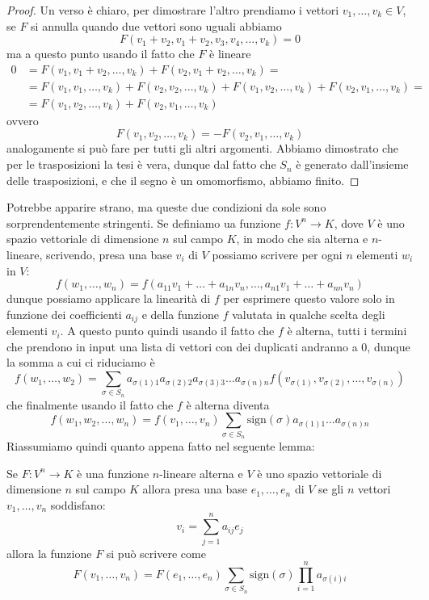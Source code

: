 \documentclass[11pt]{scrartcl}
\begin{document}
   	 \begin{proof}
   	 	Un verso è chiaro, per dimostrare l'altro prendiamo i vettori $v_1,\dots,v_k\in V$, se $F$ si annulla quando due vettori sono uguali abbiamo
   	 	$$F(v_1+v_2,v_1+v_2,v_3,v_4,\dots,v_k)=0$$
   	 	ma a questo punto usando il fatto che $F$ è lineare
   	 	\begin{align*}
   	 		0&=F(v_1,v_1+v_2,\dots,v_k)+F(v_2,v_1+v_2,\dots,v_k)=  \\
   	 		&=F(v_1,v_1,\dots,v_k)+F(v_2,v_2,\dots,v_k)+F(v_1,v_2,\dots,v_k)+F(v_2,v_1,\dots,v_k)= \\
   	 		&=F(v_1,v_2,\dots,v_k)+F(v_2,v_1,\dots,v_k)
   	 	\end{align*}
   	 	ovvero
   	 	$$F(v_1,v_2,\dots,v_k)=-F(v_2,v_1,\dots,v_k)$$
   	 	analogamente si può fare per tutti gli altri argomenti. Abbiamo dimostrato che per le trasposizioni la tesi è vera, dunque dal fatto che $S_n$ è generato dall'insieme delle trasposizioni, e che il segno è un omomorfismo, abbiamo finito.
   	 \end{proof}
   	 Potrebbe apparire strano, ma queste due condizioni da sole sono sorprendentemente stringenti. Se definiamo ua funzione $f:V^n\to K$, dove $V$ è uno spazio vettoriale di dimensione $n$ sul campo $K$, in modo che sia alterna e $n$-lineare, scrivendo, presa una base $v_i$ di $V$ possiamo scrivere per ogni $n$ elementi $w_i$ in $V$:
   	 $$f(w_1,\dots,w_n)=f(a_{11}v_1+\dots+a_{1n}v_n,\dots,a_{n1}v_1+\dots+a_{nn}v_n)$$
   	 dunque possiamo applicare la linearità di $f$ per esprimere questo valore solo in funzione dei coefficienti $a_{ij}$ e della funzione $f$ valutata in qualche scelta degli elementi $v_i$. A questo punto quindi usando il fatto che $f$ è alterna, tutti i termini che prendono in input una lista di vettori con dei duplicati andranno a $0$, dunque la somma a cui ci riduciamo è
   	 $$f(w_1,\dots,w_2)=\sum_{\sigma\in S_n}a_{\sigma(1)1}a_{\sigma(2)2}a_{\sigma(3)3}\dots a_{\sigma(n)n}f\left(v_{\sigma(1)},v_{\sigma(2)},\dots,v_{\sigma(n)}\right)$$
   	 che finalmente usando il fatto che $f$ è alterna diventa
   	 $$f(w_1,w_2,\dots,w_n)=f(v_1,\dots,v_n)\sum_{\sigma\in S_n}\text{sign}(\sigma)a_{\sigma(1)1}\dots a_{\sigma(n)n}$$
   	 Riassumiamo quindi quanto appena fatto nel seguente lemma:
   	 \begin{lemma}\label{formula per le forme nlineari}
   	 	Se $F:V^n\to K$ è una funzione $n$-lineare alterna e $V$ è uno spazio vettoriale di dimensione $n$ sul campo $K$ allora presa una base $e_1,\dots,e_n$ di $V$ se gli $n$ vettori $v_1,\dots,v_n$ soddisfano:
   	 	$$v_i=\sum_{j=1}^{n}a_{ij}e_j$$
   	 	allora la funzione $F$ si può scrivere come
   	 	$$F(v_1,\dots,v_n)=F(e_1,\dots,e_n)\sum_{\sigma\in S_n}\text{sign}(\sigma)\prod_{i=1}^{n}a_{\sigma(i)i}$$
   	 \end{lemma}
\end{document}
